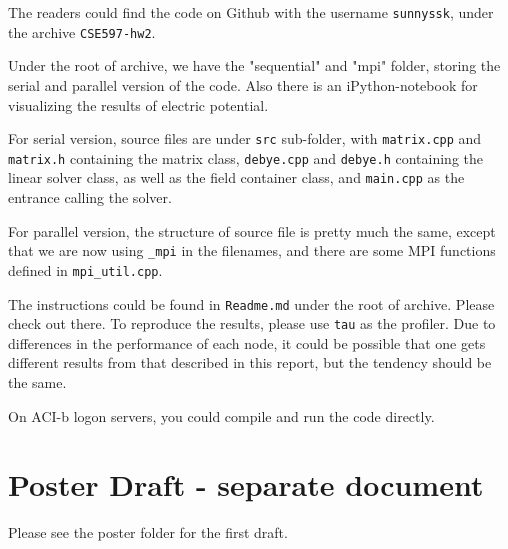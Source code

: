 \documentclass{article}
\begin{document}
\begin{spacing}{1.1}
\begin{appendices}
The readers could find the code on Github with the username \texttt{sunnyssk}, under the archive \texttt{CSE597-hw2}.

Under the root of archive, we have the "sequential" and "mpi" folder, storing the serial and parallel version of the code. Also there is an iPython-notebook for visualizing the results of electric potential. 

For serial version, source files are under \texttt{src} sub-folder, with \texttt{matrix.cpp} and \texttt{matrix.h} containing the matrix class, \texttt{debye.cpp} and \texttt{debye.h} containing the linear solver class, as well as the field container class, and \texttt{main.cpp} as the entrance calling the solver.

For parallel version, the structure of source file is pretty much the same, except that we are now using \texttt{\_mpi} in the filenames, and there are some MPI functions defined in \texttt{mpi\_util.cpp}.

The instructions could be found in \texttt{Readme.md} under the root of archive. Please check out there. To reproduce the results, please use \texttt{tau} as the profiler. Due to differences in the performance of each node, it could be possible that one gets different results from that described in this report, but the tendency should be the same.

On ACI-b logon servers, you could compile and run the code directly.

\section{Poster Draft - separate document}

Please see the poster folder for the first draft.

\end{appendices}





\end{spacing}
\end{document}

